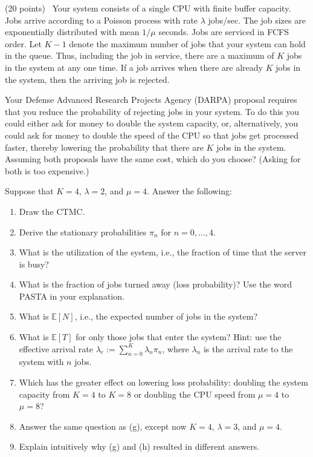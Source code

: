\documentclass[11pt,letterpaper]{article}
\newenvironment{examquestion}[2]{%
  \clearpage
  \begin{list}{}{%
    \setlength{\leftmargin}{2.15em}%
    \setlength{\labelwidth}{1.55em}%
    \setlength{\labelsep}{0.60em}%
    \setlength{\itemindent}{0pt}%
    \setlength{\listparindent}{0pt}%
    \setlength{\parsep}{0.42em}%
    \setlength{\topsep}{0pt}%
  }
  \item[\hfill #1.] (#2 points)\ 
}{%
  \end{list}
}
\newcommand{\E}{\mathbb{E}}
\begin{document}
\begin{examquestion}{5}{20}
Your system consists of a single CPU with finite buffer capacity. Jobs arrive
according to a Poisson process with rate $\lambda$ jobs/sec. The job sizes are
exponentially distributed with mean $1/\mu$ seconds. Jobs are serviced in FCFS order.
Let $K-1$ denote the maximum number of jobs that your system can hold in the queue.
Thus, including the job in service, there are a maximum of $K$ jobs in the system at
any one time. If a job arrives when there are already $K$ jobs in the system, then the
arriving job is rejected.

Your Defense Advanced Research Projects Agency (DARPA) proposal requires that you
reduce the probability of rejecting jobs in your system. To do this you could either
ask for money to double the system capacity, or, alternatively, you could ask for money
to double the speed of the CPU so that jobs get processed faster, thereby lowering the
probability that there are $K$ jobs in the system. Assuming both proposals have the
same cost, which do you choose? (Asking for both is too expensive.)

Suppose that $K=4$, $\lambda=2$, and $\mu=4$. Answer the following:
\begin{enumerate}[label=(\alph*),leftmargin=2.2em]
  \item Draw the CTMC.
  \item Derive the stationary probabilities $\pi_n$ for $n=0,\ldots,4$.
  \item What is the utilization of the system, i.e., the fraction of time that the
  server is busy?
  \item What is the fraction of jobs turned away (loss probability)? Use the word
  PASTA in your explanation.
  \item What is $\E[N]$, i.e., the expected number of jobs in the system?
  \item What is $\E[T]$ for only those jobs that enter the system? Hint: use the
  effective arrival rate $\lambda_e:=\sum_{n=0}^{K}\lambda_n\pi_n$, where
  $\lambda_n$ is the arrival rate to the system with $n$ jobs.
  \item Which has the greater effect on lowering loss probability: doubling the system
  capacity from $K=4$ to $K=8$ or doubling the CPU speed from $\mu=4$ to $\mu=8$?
  \item Answer the same question as (g), except now $K=4$, $\lambda=3$, and $\mu=4$.
  \item Explain intuitively why (g) and (h) resulted in different answers.
\end{enumerate}


\end{examquestion}
\end{document}
